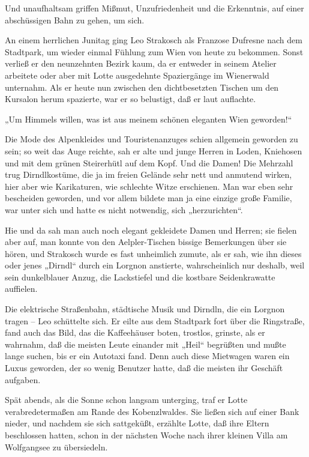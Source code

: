 Und unaufhaltsam griffen Mißmut, Unzufriedenheit und die
Erkenntnis, auf einer abschüssigen Bahn zu gehen, um sich.

\tb{* * *}
An einem herrlichen Junitag ging Leo Strakosch als Franzose
Dufresne nach dem Stadtpark, um wieder einmal Fühlung zum Wien von
heute zu bekommen. Sonst verließ er den neunzehnten Bezirk kaum, da
er entweder in seinem Atelier arbeitete oder aber mit Lotte
ausgedehnte Spaziergänge im Wienerwald unternahm. Als er heute nun
zwischen den dichtbesetzten Tischen um den Kursalon herum
spazierte, war er so belustigt, daß er laut auflachte.

„Um Himmels willen, was ist aus meinem schönen eleganten Wien
geworden!“

Die Mode des Alpenkleides und Touristenanzuges schien allgemein
geworden zu sein; so weit das Auge reichte, sah er alte und junge
Herren in Loden, Kniehosen und mit dem grünen Steirerhütl auf dem
Kopf. Und die  Damen! Die Mehrzahl trug
Dirndlkostüme, die ja im freien Gelände sehr nett und anmutend
wirken, hier aber wie Karikaturen, wie schlechte Witze erschienen.
Man war eben sehr bescheiden geworden, und vor allem bildete man ja
eine einzige große Familie, war unter sich und hatte es nicht
notwendig, sich „herzurichten“.

Hie und da sah man auch noch elegant gekleidete Damen und Herren;
sie fielen aber auf, man konnte von den Aelpler-Tischen bissige
Bemerkungen über sie hören, und Strakosch wurde es fast unheimlich
zumute, als er sah, wie ihn dieses oder jenes „Dirndl“ durch ein
Lorgnon anstierte, wahrscheinlich nur deshalb, weil sein
dunkelblauer Anzug, die Lackstiefel und die kostbare Seidenkrawatte
auffielen.

Die elektrische Straßenbahn, städtische Musik und Dirndln, die ein
Lorgnon tragen – Leo schüttelte sich. Er eilte aus dem Stadtpark
fort über die Ringstraße, fand auch das Bild, das die Kaffeehäuser
boten, trostlos, grinste, als er wahrnahm, daß die meisten Leute
einander mit „Heil“ begrüßten und mußte lange suchen, bis er ein
Autotaxi fand. Denn auch diese Mietwagen waren ein Luxus geworden,
der so wenig Benutzer hatte, daß die meisten ihr Geschäft
aufgaben.

Spät abends, als die Sonne schon langsam unterging, traf er Lotte
verabredetermaßen am Rande des Kobenzlwaldes. Sie ließen sich auf
einer Bank nieder, und nachdem sie sich sattgeküßt, erzählte Lotte,
daß ihre Eltern beschlossen hatten, schon in der nächsten Woche
nach ihrer kleinen Villa am Wolfgangsee zu übersiedeln.

